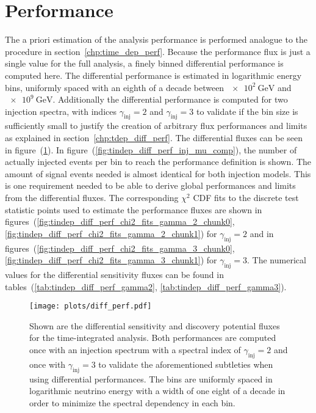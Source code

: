 \section{Performance}
The a priori estimation of the analysis performance is performed analogue to the procedure in section~\ref{chp:time_dep_perf}.
Because the performance flux is just a single value for the full analysis, a finely binned differential performance is computed here.
The differential performance is estimated in logarithmic energy bins, uniformly spaced with an eighth of a decade between $\SI{e2}{\GeV}$ and $\SI{e9}{\GeV}$.
Additionally the differential performance is computed for two injection spectra, with indices $\gamma_\text{inj} = 2$ and $\gamma_\text{inj} = 3$ to validate if the bin size is sufficiently small to justify the creation of arbitrary flux performances and limits as explained in section~\ref{chp:tdep_diff_perf}.
The differential fluxes can be seen in figure~(\ref{fig:tindep_diff_perf}).
In figure~(\ref{fig:tindep_diff_perf_inj_mu_comp}), the number of actually injected events per bin to reach the performance definition is shown.
The amount of signal events needed is almost identical for both injection models.
This is one requirement needed to be able to derive global performances and limits from the differential fluxes.
The corresponding $\chi^2$ CDF fits to the discrete test statistic points used to estimate the performance fluxes are shown in figures~(\ref{fig:tindep_diff_perf_chi2_fits_gamma_2_chunk0}, \ref{fig:tindep_diff_perf_chi2_fits_gamma_2_chunk1}) for $\gamma_\text{inj}=2$ and in figures~(\ref{fig:tindep_diff_perf_chi2_fits_gamma_3_chunk0}, \ref{fig:tindep_diff_perf_chi2_fits_gamma_3_chunk1}) for $\gamma_\text{inj}=3$.
The numerical values for the differential sensitivity fluxes can be found in tables~(\ref{tab:tindep_diff_perf_gamma2}, \ref{tab:tindep_diff_perf_gamma3}).

\begin{figure}[htbp]
  \centering
  \texttt{[image: plots/diff\_perf.pdf]}
  \caption[Differential performance of the time-integrated analysis]{
    Shown are the differential sensitivity and discovery potential fluxes for the time-integrated analysis.
    Both performances are computed once with an injection spectrum with a spectral index of $\gamma_\text{inj}=2$ and once with $\gamma_\text{inj}=3$ to validate the aforementioned subtleties when using differential performances.
    The bins are uniformly spaced in logarithmic neutrino energy with a width of one eight of a decade in order to minimize the spectral dependency in each bin.
  }
  \label{fig:tindep_diff_perf}
\end{figure}

